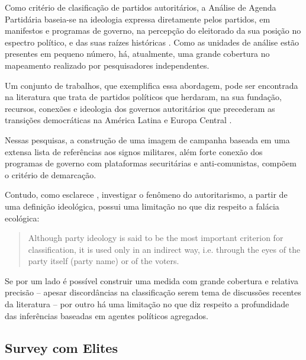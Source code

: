 \documentclass[
12pt,				%
openright,			%
twoside,			%
a4paper,			%
english,			%
french,				%
spanish,			%
brazil				%
]{abntex2}
\begin{document}
Como critério de clasificação de partidos autoritários, a Análise de Agenda Partidária baseia-se na ideologia expressa diretamente pelos partidos, em manifestos e programas de governo, na percepção do eleitorado da sua posição no espectro político, e das suas raízes históricas \cite{mudde2000ideology}. Como as unidades de análise estão presentes em pequeno número, há, atualmente, uma grande cobertura no mapeamento realizado por pesquisadores independentes.

Um conjunto de trabalhos, que exemplifica essa abordagem, pode ser encontrada na literatura que trata de partidos políticos que herdaram, na sua fundação, recursos, conexões e ideologia dos governos autoritários que precederam as transições democráticas na América Latina \cite{loxton2015authoritarian, loxton2014authoritarian, lyons2016victorious, loxton2015authoritarian} e Europa Central \cite{grzymala2006authoritarian}. 

Nessas pesquisas, a construção de uma imagem de campanha baseada em uma extensa lista de referências aos signos militares, além forte conexão dos programas de governo com plataformas securitárias e anti-comunistas, compõem o critério de demarcação.

Contudo, como esclarece , investigar o fenômeno do autoritarismo, a partir de uma definição ideológica, possui uma limitação no que diz respeito a falácia ecológica:

\vspace{-.25cm}
\begin{samepage}
	\begin{quote}
		Although party ideology is said to be the most important criterion for classification, it is used only in an indirect way, i.e. through the eyes of the party itself (party name) or of the voters. \cite{mudde2000ideology}
	\end{quote}
\end{samepage}
\vspace{-.25cm}

Se por um lado é possível construir uma medida com grande cobertura e relativa precisão -- apesar discordâncias na classificação serem tema de discussões recentes da literatura \cite{glasius2018authoritarianism, mudde2016introduction} -- por outro há uma limitação no que diz respeito a profundidade das inferências baseadas em agentes políticos agregados.

\subsection{Survey com Elites}
\end{document}
